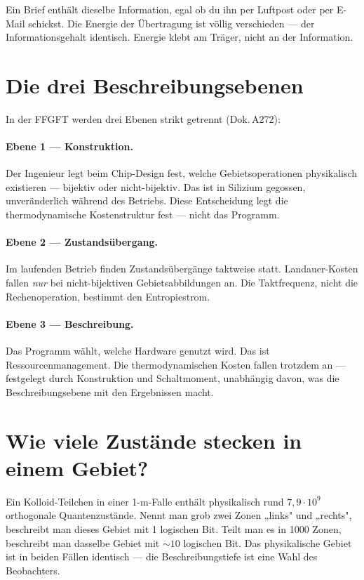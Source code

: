 \begin{laierspur}
Ein Brief enthält dieselbe Information, egal ob du ihn per Luftpost oder
per E-Mail schickst. Die Energie der Übertragung ist völlig verschieden ---
der Informationsgehalt identisch. Energie klebt am Träger,
nicht an der Information.
\end{laierspur}

\section{Die drei Beschreibungsebenen}

In der FFGFT werden drei Ebenen strikt getrennt (Dok.\,A272): 

\paragraph{Ebene 1 --- Konstruktion.}
Der Ingenieur legt beim Chip-Design fest, welche Gebietsoperationen
physikalisch existieren --- bijektiv oder nicht-bijektiv. Das ist in Silizium
gegossen, unveränderlich während des Betriebs. Diese Entscheidung legt
die thermodynamische Kostenstruktur fest --- nicht das Programm.

\paragraph{Ebene 2 --- Zustandsübergang.}
Im laufenden Betrieb finden Zustandsübergänge taktweise statt.
Landauer-Kosten fallen \emph{nur} bei nicht-bijektiven Gebietsabbildungen an.
Die Taktfrequenz, nicht die Rechenoperation, bestimmt den Entropiestrom.

\paragraph{Ebene 3 --- Beschreibung.}
Das Programm wählt, welche Hardware genutzt wird. Das ist
Ressourcenmanagement. Die thermodynamischen Kosten fallen trotzdem an ---
festgelegt durch Konstruktion und Schaltmoment, unabhängig davon,
was die Beschreibungsebene mit den Ergebnissen macht.

\section{Wie viele Zustände stecken in einem Gebiet?}

Ein Kolloid-Teilchen in einer 1-\textmu m-Falle enthält physikalisch rund
$7{,}9 \cdot 10^9$ orthogonale Quantenzustände. Nennt man grob zwei Zonen
„links" und „rechts", beschreibt man dieses Gebiet mit 1 logischen Bit.
Teilt man es in 1000 Zonen, beschreibt man dasselbe Gebiet mit ${\sim}10$
logischen Bit. Das physikalische Gebiet ist in beiden Fällen identisch ---
die Beschreibungstiefe ist eine Wahl des Beobachters. 

